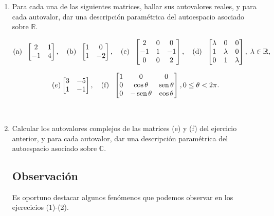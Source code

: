 \documentclass[12pt]{amsart}
\begin{document}
\begin{enumerate}


\item Para cada una de las siguientes matrices, hallar sus autovalores reales, y para cada autovalor, dar una descripci\' on param\'etrica del autoespacio asociado sobre $\mathbb{R}$.


$$\textrm{(a)\; } \left[\begin{matrix} 2 & 1\\ -1 & 4 \end{matrix} \right],
\quad
\textrm{(b)\; }
\left[\begin{matrix} 1 & 0\\ 1 & -2 \end{matrix} \right],
\quad \textrm{(c)\; } \left[\begin{matrix}2 & 0 & 0\\ -1 & 1& -1\\ 0 & 0 & 2 \end{matrix} \right] ,
\quad
\textrm{(d)\; } \begin{bmatrix} \lambda & 0 & 0 \\ 1 & \lambda & 0\\ 0 & 1 & \lambda \\ \end{bmatrix}, \; \lambda\in \mathbb R,$$


$$(e)\begin{bmatrix} 3 & -5 \\ 1 & -1 \end{bmatrix},
\quad
\textrm{(f)\; } \left[\begin{matrix}1 & 0& 0 \\ 0 & \cos\theta & \operatorname{sen}\theta\\ 0 & -\operatorname{sen}\theta & \cos\theta \end{matrix} \right], 0\leq \theta<2\pi.
$$

\

\item Calcular los autovalores complejos de las matrices (e) y (f) del ejercicio anterior, y para cada autovalor, dar una descripci\' on param\'etrica del autoespacio asociado sobre $\mathbb{C}$.


\subsection*{Observaci\'{o}n} Es oportuno destacar algunos fen\'omenos que podemos observar en los ejerecicios (1)-(2).


\end{enumerate}
\end{document}

